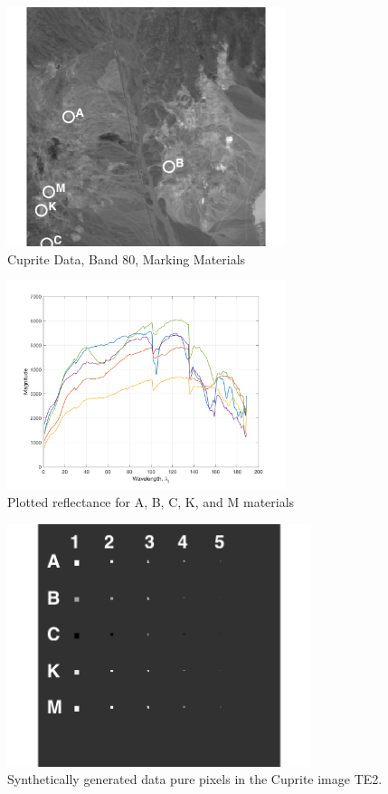 \documentclass[journal]{IEEEtran}
\begin{document}
\begin{figure}[!h]
    \centering
    \includegraphics[width=3.20in]{cuprite_groundTruth.png}
    \caption{Cuprite Data, Band 80, Marking Materials}
    \label{fig:cuprite}
\end{figure}

\begin{figure}[!h]
    \centering
    \includegraphics[width=3.20in]{reflectance.png}
    \caption{Plotted reflectance for A, B, C, K, and M materials}
    \label{fig:reflectance}
\end{figure}

\begin{figure}[!h]
    \centering
    \includegraphics[width=3.5in]{synthetic_labeled.png}
    \caption{Synthetically generated data pure pixels in the Cuprite image TE2.}
    \label{fig:syn}
\end{figure}
\end{document}
